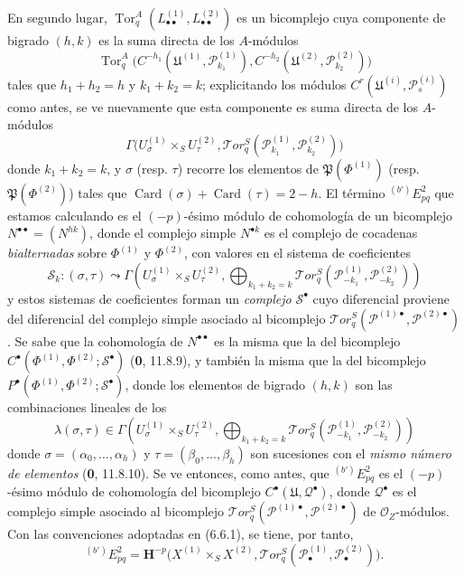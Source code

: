 \begin{env}[6.6.4]
En segundo lugar,
$\operatorname{Tor}_q^A(L_{\bullet\bullet}^{(1)},L_{\bullet\bullet}^{(2)})$ es un
bicomplejo cuya componente de bigrado $(h,k)$ es la suma directa de los
$A$-módulos
\[
  \operatorname{Tor}_q^A
  \bigl(C^{-h_1}(\mathfrak U^{(1)},\mathscr P_{k_1}^{(1)}),
        C^{-h_2}(\mathfrak U^{(2)},\mathscr P_{k_2}^{(2)})\bigr)
\]
tales que $h_1+h_2=h$ y $k_1+k_2=k$; explicitando los módulos
$C^r(\mathfrak U^{(i)},\mathscr P_s^{(i)})$ como antes, se ve nuevamente que
esta componente es suma directa de los $A$-módulos
\[
  \Gamma\bigl(U_\sigma^{(1)}\times_S U_\tau^{(2)},
    \mathscr{T}\!or_q^S
    (\mathscr P_{k_1}^{(1)},\mathscr P_{k_2}^{(2)})\bigr)
\]
donde $k_1+k_2=k$, y $\sigma$ (resp. $\tau$) recorre los elementos
de $\mathfrak P(\Phi^{(1)})$ (resp.
$\mathfrak P(\Phi^{(2)})$) tales que
$\operatorname{Card}(\sigma)+\operatorname{Card}(\tau)=2-h$. El término
${}^{(b')}E_{pq}^2$ que estamos calculando es el $(-p)$-ésimo módulo
de cohomología de un bicomplejo $N^{\bullet\bullet}=(N^{hk})$, donde el
complejo simple $N^{\bullet k}$ es el complejo de cocadenas \emph{bialternadas} sobre
$\Phi^{(1)}$ y $\Phi^{(2)}$, con valores en el sistema de coeficientes
\[
  \mathscr S_k:(\sigma,\tau)\leadsto
  \Gamma\left(U_\sigma^{(1)}\times_S U_\tau^{(2)},
    \bigoplus_{k_1+k_2=k}
    \mathscr{T}\!or_q^S
    (\mathscr P_{-k_1}^{(1)},\mathscr P_{-k_2}^{(2)})\right)
\]
y estos sistemas de coeficientes forman un \emph{complejo} $\mathscr S^\bullet$ cuyo
diferencial proviene del diferencial del complejo simple asociado al bicomplejo
$\mathscr{T}\!or_q^S
(\mathscr P^{(1)\bullet},\mathscr P^{(2)\bullet})$. Se sabe que la
cohomología de $N^{\bullet\bullet}$ es la misma que la del bicomplejo
$C^\bullet(\Phi^{(1)},\Phi^{(2)};\mathscr S^\bullet)$
(\textbf{0}, 11.8.9), y también la misma que la del bicomplejo
$P^\bullet(\Phi^{(1)},\Phi^{(2)};\mathscr S^\bullet)$, donde los elementos de
bigrado $(h,k)$ son las combinaciones lineales de los
\[
  \lambda(\sigma,\tau)\in
  \Gamma\left(U_\sigma^{(1)}\times_S U_\tau^{(2)},
    \bigoplus_{k_1+k_2=k}
    \mathscr{T}\!or_q^S
    (\mathscr P_{-k_1}^{(1)},\mathscr P_{-k_2}^{(2)})\right)
\]
donde $\sigma=(\alpha_0,\ldots,\alpha_h)$ y
$\tau=(\beta_0,\ldots,\beta_h)$ son sucesiones con el \emph{mismo número de
elementos} (\textbf{0}, 11.8.10). Se ve entonces, como antes, que
${}^{(b')}E_{pq}^2$ es el $(-p)$-ésimo módulo de cohomología del
bicomplejo $C^\bullet(\mathfrak U,\mathscr Q^\bullet)$, donde
$\mathscr Q^\bullet$ es el complejo simple asociado al bicomplejo
$\mathscr{T}\!or_q^S
(\mathscr P^{(1)\bullet},\mathscr P^{(2)\bullet})$ de
$\mathscr O_Z$-módulos. Con las convenciones adoptadas en (6.6.1), se tiene,
por tanto,
\[
  {}^{(b')}E_{pq}^2
  =\mathbf H^{-p}\bigl(X^{(1)}\times_S X^{(2)},
    \mathscr{T}\!or_q^S
    (\mathscr P_\bullet^{(1)},\mathscr P_\bullet^{(2)})\bigr).
\]
\end{env}

